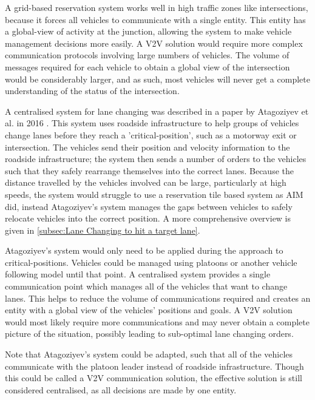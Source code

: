 A grid-based reservation system works well in high traffic zones like intersections, because it forces all vehicles to communicate with a single entity. This entity has a global-view of activity at the junction, allowing the system to make vehicle management decisions more easily. A V2V solution would require more complex communication protocols involving large numbers of vehicles. The volume of messages required for each vehicle to obtain a global view of the intersection would be considerably larger, and as such, most vehicles will never get a complete understanding of the status of the intersection.

A centralised system for lane changing was described in a paper by Atagoziyev et al. in 2016 \citep{Atagoziyev2016}. This system uses roadside infrastructure to help groups of vehicles change lanes before they reach a 'critical-position', such as a motorway exit or intersection. The vehicles send their position and velocity information to the roadside infrastructure; the system then sends a number of orders to the vehicles such that they safely rearrange themselves into the correct lanes.  Because the distance travelled by the vehicles involved can be large, particularly at high speeds, the system would struggle to use a reservation tile based system as AIM did, instead Atagoziyev's system manages the gaps between vehicles to safely relocate vehicles into the correct position. A more comprehensive overview is given in \ref{subsec:Lane Changing to hit a target lane}.

Atagoziyev's system would only need to be applied during the approach to critical-positions. Vehicles could be managed using platoons or another vehicle following model until that point. A centralised system provides a single communication point which manages all of the vehicles that want to change lanes. This helps to reduce the volume of communications required and creates an entity with a global view of the vehicles' positions and goals. A V2V solution would most likely require more communications and may never obtain a complete picture of the situation, possibly leading to sub-optimal lane changing orders.

Note that Atagoziyev's system could be adapted, such that all of the vehicles communicate with the platoon leader instead of roadside infrastructure. Though this could be called a V2V communication solution, the effective solution is still considered centralised, as all decisions are made by one entity.


